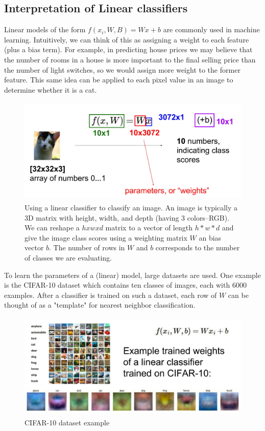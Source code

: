 \documentclass[twoside]{article}
\begin{document}
\subsection{Interpretation of Linear classifiers}
Linear models of the form $f(x_i,W,B) = Wx + b$ are commonly used in machine learning. Intuitively, we can think of this as assigning a weight to each feature (plus a bias term). For example, in predicting house prices we may believe that the number of rooms in a house is more important to the final selling price than the number of light switches, so we would assign more weight to the former feature. This same idea can be applied to each pixel value in an image to determine whether it is a cat.
\begin{figure}[H]
\centering
\includegraphics[height = 2in]{pics/lecture_8_parameters.jpg}
\caption{Using a linear classifier to classify an image. An image is typically a 3D matrix with height, width, and depth (having 3 colors--RGB). We can reshape a $h x w x d$ matrix to a vector of length $h*w*d$ and give the image class scores using a weighting matrix $W$ an bias vector $b$. The number of rows in $W$ and $b$ corresponds to the number of classes we are evaluating.}
\end{figure}

To learn the parameters of a (linear) model, large datasets are used. One example is the CIFAR-10 dataset which contains ten classes of images, each with 6000 examples. After a classifier is trained on such a dataset, each row of $W$ can be thought of as a "template" for nearest neighbor classification.
\begin{figure}[H]
\centering
\includegraphics[height = 2in]{pics/lecture_8_linear_classifier_interpretation.jpg}
\caption{CIFAR-10 dataset example}
\end{figure}
\end{document}
